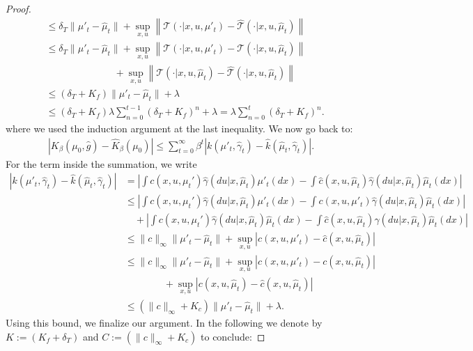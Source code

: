 \documentclass[10pt,a4paper]{amsart}
\begin{document}
\begin{proof}
\begin{align*}
&\leq \delta_T \|\mu'_t - \hat{\mu}_t\| +  \sup_{x,u}\left\|{\mathcal{T}}(\cdot|x,u,\mu'_t)  -  \hat{\mathcal{T}}(\cdot|x,u,\hat{\mu}_t)\right\|\\
& \leq  \delta_T \|\mu'_t - \hat{\mu}_t\| +  \sup_{x,u}\left\|{\mathcal{T}}(\cdot|x,u,\mu'_t)  -  {\mathcal{T}}(\cdot|x,u,\hat{\mu}_t)\right\| \\
& \qquad \qquad\qquad \quad +   \sup_{x,u}\left\|{\mathcal{T}}(\cdot|x,u,\hat{\mu}_t)  -  \hat{\mathcal{T}}(\cdot|x,u,\hat{\mu}_t)\right\|   \\
& \leq (\delta_T + K_f) \|\mu'_t - \hat{\mu}_t\| + \lambda \\
& \leq (\delta_T + K_f)  \lambda \sum_{n=0}^{t-1}(\delta_T + K_f)^n  +\lambda  =  \lambda \sum_{n=0}^{t} (\delta_T + K_f)^n.
\end{align*}
where we used the induction argument at the last inequality.  We now go back to:
\begin{align*}
 \left| K_\beta(\mu_0,\hat{g})  - \hat{K}_\beta(\mu_0)\right| \leq \sum_{t=0}^\infty \beta^t \left| k(\mu'_t,\hat{\gamma}_t) - \hat{k}(\hat{\mu}_t,\hat{\gamma}_t) \right|.
\end{align*}
For the term inside the summation, we write
\begin{align*}
\left| k(\mu'_t,\hat{\gamma}_t) - \hat{k}(\hat{\mu}_t,\hat{\gamma}_t) \right|& = \left| \int c(x,u,\mu_t')\hat{\gamma}(du|x,\hat{\mu}_t) \mu'_t(dx) - \int \hat{c}(x,u,\hat{\mu}_t)\hat{\gamma}(du|x,\hat{\mu}_t)\hat{\mu}_t(dx)\right|\\
&\leq  \left| \int c(x,u,\mu_t')\hat{\gamma}(du|x,\hat{\mu}_t) \mu'_t(dx) - \int {c}(x,u,\mu'_t)\hat{\gamma}(du|x,\hat{\mu}_t)\hat{\mu}_t(dx)\right|\\
& \quad +  \left| \int c(x,u,\mu_t')\hat{\gamma}(du|x,\hat{\mu}_t) \hat{\mu}_t(dx) - \int \hat{c}(x,u,\hat{\mu}_t)\hat{\gamma}(du|x,\hat{\mu}_t)\hat{\mu}_t(dx)\right|\\
&\leq \|c\|_\infty \|\mu'_t - \hat{\mu}_t\| + \sup_{x,u}\left| c(x,u,\mu'_t) - \hat{c}(x,u, \hat{\mu}_t) \right|\\
&\leq \|c\|_\infty \|\mu'_t - \hat{\mu}_t\| + \sup_{x,u}\left| c(x,u,\mu'_t) - c(x,u, \hat{\mu}_t) \right|\\
&\qquad\qquad + \sup_{x,u}\left| c(x,u, \hat{\mu}_t) - \hat{c}(x,u, \hat{\mu}_t) \right|\\
&\leq (\|c\|_\infty + K_c)  \|\mu'_t - \hat{\mu}_t\| + \lambda.
\end{align*}
Using this bound, we finalize our argument. In the following we denote by $K:= (K_f + \delta_T)$ and $C:=(\|c\|_\infty + K_c)$ to conclude:

\end{proof}
\end{document}
